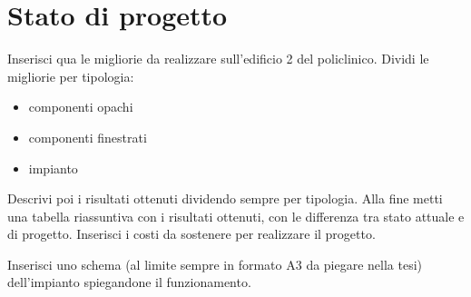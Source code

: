 \chapter{Stato di progetto}
\thispagestyle{empty}
Inserisci qua le migliorie da realizzare sull'edificio 2 del policlinico. Dividi le migliorie per tipologia:
\begin{itemize}
	\item componenti opachi
	\item componenti finestrati
	\item impianto
\end{itemize}
Descrivi poi i risultati ottenuti dividendo sempre per tipologia. Alla fine metti una tabella riassuntiva con i risultati ottenuti, con le differenza tra stato attuale e di progetto. Inserisci i costi da sostenere per realizzare il progetto.

Inserisci uno schema (al limite sempre in formato A3 da piegare nella tesi) dell'impianto spiegandone il funzionamento.